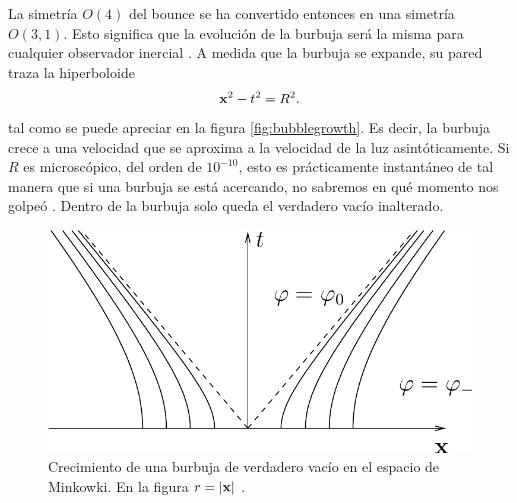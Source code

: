 La simetría $O(4)$ del bounce se ha convertido entonces en una simetría $O(3, 1)$. Esto significa que la evolución de la burbuja será la misma para cualquier observador inercial \cite{coleman1977fate}. A medida que la burbuja se expande, su pared traza la hiperboloide
\begin{equation}
\vb{x}^2 - t^2 = R^2.
\end{equation}
tal como se puede apreciar en la figura \eqref{fig:bubblegrowth}. Es decir, la burbuja crece a una velocidad que se aproxima a la velocidad de la luz asintóticamente. Si $R$ es microscópico, del orden de $10^{-10}$, esto es prácticamente instantáneo  de tal manera que si una burbuja se está acercando, no sabremos en qué momento nos golpeó \cite{paranjape2017theory}. Dentro de la burbuja solo queda el verdadero vacío inalterado.

\begin{figure}[t]
	\centering
	\includegraphics[scale=0.45]{FIGURAS/bubble_growth}
	\caption{Crecimiento de una burbuja de verdadero vacío en el espacio de Minkowki. En la figura $r = \qty|\vb{x}|$ \cite{paranjape2017theory}.}
	\label{fig:bubblegrowth}
\end{figure}



